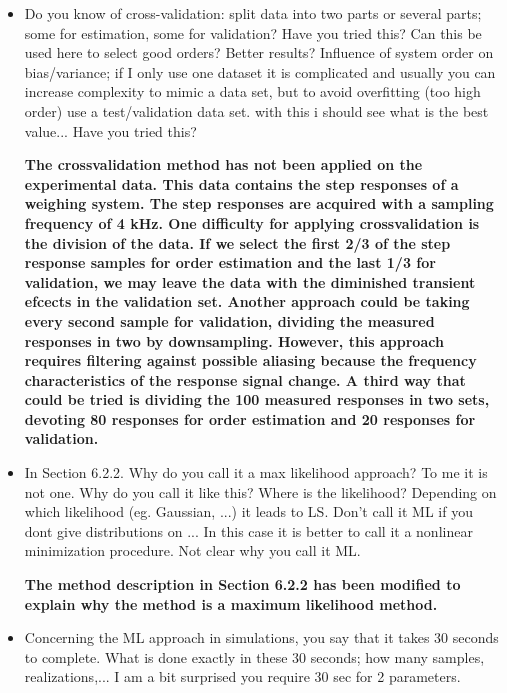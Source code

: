 \documentclass[11pt]{article}
\begin{document}
\begin{itemize}
	
	
	\item   Do you know of cross-validation: split data into two parts or several parts; some for estimation, some for validation? Have you tried this? Can this be used here to select good orders? Better results? Influence of system order on bias/variance; if I only use one dataset it is complicated and usually you can increase complexity to mimic a data set, but to avoid overfitting (too high order) use a test/validation data set. with this i should see what is the best value... Have you tried this?
	
	{\bfseries The crossvalidation method has not been applied on the experimental data. This data contains the step responses of a weighing system. The step responses are acquired with a sampling frequency of 4 kHz. One difficulty for applying crossvalidation is the division of the data. If we select the first 2/3 of the step response samples for order estimation and the last 1/3 for validation, we may leave the data with the diminished transient efcects in the validation set. Another approach could be taking every second sample for validation, dividing the measured responses in two by downsampling. However, this approach requires filtering against possible aliasing because the frequency characteristics of the response signal change. A third way that could be tried is dividing the 100 measured responses in two sets, devoting 80 responses for order estimation and 20 responses for validation.   }
	
	\item   In Section 6.2.2. Why do you call it a max likelihood approach? To me it is not one. Why do you call it like this? Where is the likelihood? Depending on which likelihood (eg. Gaussian, ...) it leads to LS. Don't call it ML if you dont give distributions on ... In this case it is better to call it a nonlinear minimization procedure. Not clear why you call it ML.
	
	{\bfseries The method description in Section 6.2.2 has been modified to explain why the method is a maximum likelihood method.  }
	
	\item   Concerning the ML approach in simulations, you say that it takes 30 seconds to complete. What is done exactly in these 30 seconds; how many samples, realizations,... I am a bit surprised you require 30 sec for 2 parameters.
	

\end{itemize}
\end{document}
